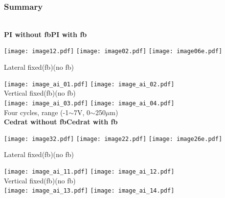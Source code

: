  
 \subsubsection{Summary}
 \\
\textbf{PI without fb}\hspace*{4cm}\textbf{PI with  fb}\par
\texttt{[image: image12.pdf]}\hspace*{2cm}
\texttt{[image: image02.pdf]}
\texttt{[image: image06e.pdf]}\par
Lateral fixed\hspace{1.8cm}(fb)\hspace{3.0cm}(no fb)\par
 \hspace*{2cm}\texttt{[image: image\_ai\_01.pdf]}
 \texttt{[image: image\_ai\_02.pdf]}\\
 Vertical fixed\hspace{1.6cm}(fb)\hspace{3.0cm}(no fb)\\
 \hspace*{2cm}\texttt{[image: image\_ai\_03.pdf]}
 \texttt{[image: image\_ai\_04.pdf]}\\
{\tiny Four cycles, range (-1$\sim$7V, 0$\sim$250$\mu$m)}\\
\textbf{Cedrat without fb}\hspace*{3.2cm}\textbf{Cedrat with  fb}\par
\texttt{[image: image32.pdf]}\hspace*{2cm}
\texttt{[image: image22.pdf]}
\texttt{[image: image26e.pdf]}\par
Lateral fixed\hspace{1.8cm}(fb)\hspace{3.0cm}(no fb)\par
 \hspace*{2cm}\texttt{[image: image\_ai\_11.pdf]}
 \texttt{[image: image\_ai\_12.pdf]}\\
 Vertical fixed\hspace{1.6cm}(fb)\hspace{3.0cm}(no fb)\\
  \hspace*{2cm}\texttt{[image: image\_ai\_13.pdf]}
 \texttt{[image: image\_ai\_14.pdf]}\\ 


